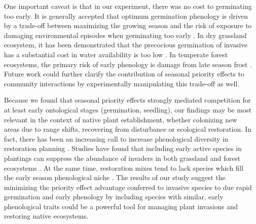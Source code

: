 \documentclass{article}[11pt]
\begin{document}
One important caveat is that in our experiment, there was no cost to germinating too early. It is generally accepted that optimum germination phenology is driven by a trade-off between maximizing the growing season and the risk of exposure to damaging environmental episodes when germinating too early \citep{}. In dry grassland ecosystem, it has been demonstrated that the precocious germination of invasive has a substantial cost in water availability is too low \citep{Wainwright_2011}. In temperate forest ecosystems, the primary risk of early phenology is damage from late season frost \citep{}. Future work could further clarify the contribution of seasonal priority effects to community interactions by experimentally manipulating this trade-off as well.

Because we found that seasonal priority effects strongly mediated competition for at least early ontological stages (germination, seedling), our findings may be most relevant in the context of native plant establishment, whether colonizing new areas due to range shifts, recovering from disturbance or ecological restoration. In fact, there has been an increasing call to increase phenological diversity in restoration planning \citep{Hess:2019vn}. Studies have found that including early active species in plantings can suppress the abundance of invaders in both grassland \citep{Cleland:2013wo} and forest ecosystems \citep{Schuster:2020ww}. At the same time, restoration mixes tend to lack species which fill the early season phenological niche \citep{Havens:2016vo}. The results of our study suggest the minimizing the priority effect advantage conferred to invasive species to due rapid germination and early phenology by including species with similar, early phenological traits could be a powerful tool for managing plant invasions and restoring native ecosystems.
\end{document}

